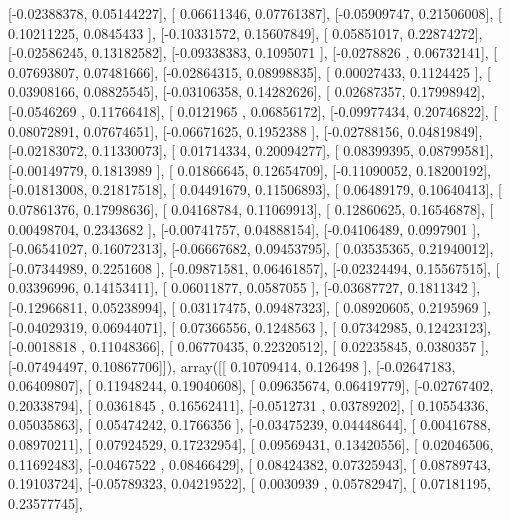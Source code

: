 \documentclass{article}
\begin{document}
       [-0.02388378,  0.05144227],
       [ 0.06611346,  0.07761387],
       [-0.05909747,  0.21506008],
       [ 0.10211225,  0.0845433 ],
       [-0.10331572,  0.15607849],
       [ 0.05851017,  0.22874272],
       [-0.02586245,  0.13182582],
       [-0.09338383,  0.1095071 ],
       [-0.0278826 ,  0.06732141],
       [ 0.07693807,  0.07481666],
       [-0.02864315,  0.08998835],
       [ 0.00027433,  0.1124425 ],
       [ 0.03908166,  0.08825545],
       [-0.03106358,  0.14282626],
       [ 0.02687357,  0.17998942],
       [-0.0546269 ,  0.11766418],
       [ 0.0121965 ,  0.06856172],
       [-0.09977434,  0.20746822],
       [ 0.08072891,  0.07674651],
       [-0.06671625,  0.1952388 ],
       [-0.02788156,  0.04819849],
       [-0.02183072,  0.11330073],
       [ 0.01714334,  0.20094277],
       [ 0.08399395,  0.08799581],
       [-0.00149779,  0.1813989 ],
       [ 0.01866645,  0.12654709],
       [-0.11090052,  0.18200192],
       [-0.01813008,  0.21817518],
       [ 0.04491679,  0.11506893],
       [ 0.06489179,  0.10640413],
       [ 0.07861376,  0.17998636],
       [ 0.04168784,  0.11069913],
       [ 0.12860625,  0.16546878],
       [ 0.00498704,  0.2343682 ],
       [-0.00741757,  0.04888154],
       [-0.04106489,  0.0997901 ],
       [-0.06541027,  0.16072313],
       [-0.06667682,  0.09453795],
       [ 0.03535365,  0.21940012],
       [-0.07344989,  0.2251608 ],
       [-0.09871581,  0.06461857],
       [-0.02324494,  0.15567515],
       [ 0.03396996,  0.14153411],
       [ 0.06011877,  0.0587055 ],
       [-0.03687727,  0.1811342 ],
       [-0.12966811,  0.05238994],
       [ 0.03117475,  0.09487323],
       [ 0.08920605,  0.2195969 ],
       [-0.04029319,  0.06944071],
       [ 0.07366556,  0.1248563 ],
       [ 0.07342985,  0.12423123],
       [-0.0018818 ,  0.11048366],
       [ 0.06770435,  0.22320512],
       [ 0.02235845,  0.0380357 ],
       [-0.07494497,  0.10867706]]), array([[ 0.10709414,  0.126498  ],
       [-0.02647183,  0.06409807],
       [ 0.11948244,  0.19040608],
       [ 0.09635674,  0.06419779],
       [-0.02767402,  0.20338794],
       [ 0.0361845 ,  0.16562411],
       [-0.0512731 ,  0.03789202],
       [ 0.10554336,  0.05035863],
       [ 0.05474242,  0.1766356 ],
       [-0.03475239,  0.04448644],
       [ 0.00416788,  0.08970211],
       [ 0.07924529,  0.17232954],
       [ 0.09569431,  0.13420556],
       [ 0.02046506,  0.11692483],
       [-0.0467522 ,  0.08466429],
       [ 0.08424382,  0.07325943],
       [ 0.08789743,  0.19103724],
       [-0.05789323,  0.04219522],
       [ 0.0030939 ,  0.05782947],
       [ 0.07181195,  0.23577745],
\end{document}
